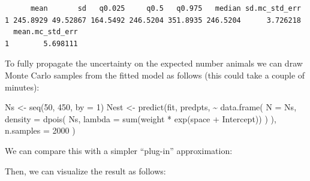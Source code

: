 \documentclass[
  letterpaper,
  DIV=11,
  numbers=noendperiod]{scrartcl}
\newenvironment{Shaded}{\begin{snugshade}}{\end{snugshade}}
\newcommand{\AttributeTok}[1]{\textcolor[rgb]{0.40,0.45,0.13}{#1}}
\newcommand{\DecValTok}[1]{\textcolor[rgb]{0.68,0.00,0.00}{#1}}
\newcommand{\FunctionTok}[1]{\textcolor[rgb]{0.28,0.35,0.67}{#1}}
\newcommand{\NormalTok}[1]{\textcolor[rgb]{0.00,0.23,0.31}{#1}}
\newcommand{\OtherTok}[1]{\textcolor[rgb]{0.00,0.23,0.31}{#1}}
\newcommand{\SpecialCharTok}[1]{\textcolor[rgb]{0.37,0.37,0.37}{#1}}
\newcommand{\StringTok}[1]{\textcolor[rgb]{0.13,0.47,0.30}{#1}}
\begin{document}
\begin{verbatim}
      mean       sd   q0.025     q0.5   q0.975   median sd.mc_std_err
1 245.8929 49.52867 164.5492 246.5204 351.8935 246.5204      3.726218
  mean.mc_std_err
1        5.698111
\end{verbatim}

To fully propagate the uncertainty on the expected number animals we can
draw Monte Carlo samples from the fitted model as follows (this could
take a couple of minutes):

\begin{Shaded}
\begin{Highlighting}[]
\NormalTok{Ns }\OtherTok{\textless{}{-}} \FunctionTok{seq}\NormalTok{(}\DecValTok{50}\NormalTok{, }\DecValTok{450}\NormalTok{, }\AttributeTok{by =} \DecValTok{1}\NormalTok{)}
\NormalTok{Nest }\OtherTok{\textless{}{-}} \FunctionTok{predict}\NormalTok{(fit, predpts,}
  \SpecialCharTok{\textasciitilde{}} \FunctionTok{data.frame}\NormalTok{(}
    \AttributeTok{N =}\NormalTok{ Ns,}
    \AttributeTok{density =} \FunctionTok{dpois}\NormalTok{(}
\NormalTok{      Ns,}
      \AttributeTok{lambda =} \FunctionTok{sum}\NormalTok{(weight }\SpecialCharTok{*} \FunctionTok{exp}\NormalTok{(space }\SpecialCharTok{+}\NormalTok{ Intercept))}
\NormalTok{    )}
\NormalTok{  ),}
  \AttributeTok{n.samples =} \DecValTok{2000}
\NormalTok{)}
\end{Highlighting}
\end{Shaded}

We can compare this with a simpler ``plug-in'' approximation:

\begin{Shaded}
\end{Shaded}

Then, we can visualize the result as follows:
\end{document}
